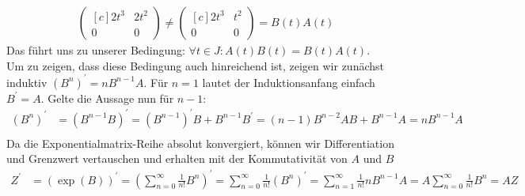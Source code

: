 \begin{solution}
\begin{align*}
\begin{pmatrix*}[c]
    2t^3 & 2t^2 \\
    0 & 0
  \end{pmatrix*} \neq
  \begin{pmatrix*}[c]
    2t^3 & t^2 \\
    0 & 0
  \end{pmatrix*} =
  B(t)A(t)
\end{align*}
Das führt uns zu unserer Bedingung: $\forall t \in J: A(t)B(t) = B(t)A(t)$. \\
Um zu zeigen, dass diese Bedingung auch hinreichend ist, zeigen wir zunächst
induktiv $(B^n)^{\prime} = nB^{n-1}A$.
Für $n = 1$ lautet der Induktionsanfang einfach $B^{\prime} = A$.
Gelte die Aussage nun für $n - 1$:
\begin{align*}
  (B^n)^{\prime} &= (B^{n-1}B)^{\prime} = (B^{n-1})^{\prime}B + B^{n-1}B^{\prime}
  = (n - 1)B^{n - 2}AB + B^{n-1}A = nB^{n-1}A \\
\end{align*}
Da die Exponentialmatrix-Reihe absolut konvergiert, können wir Differentiation
und Grenzwert vertauschen und erhalten mit der Kommutativität von $A$ und $B$
\begin{align*}
  Z^{\prime} &= (\exp(B))^{\prime} = (\sum_{n=0}^{\infty}\frac{1}{n!}B^n)^{\prime}
  = \sum_{n=0}^{\infty}\frac{1}{n!}(B^n)^{\prime} =
  \sum_{n=1}^{\infty}\frac{1}{n!}nB^{n-1}A = A \sum_{n=0}^{\infty}\frac{1}{n!}B^n
  = AZ
\end{align*}
\end{solution}
